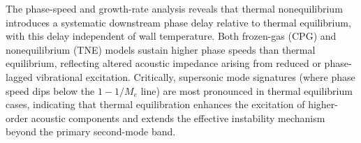 The phase-speed and growth-rate analysis reveals that thermal nonequilibrium introduces a systematic downstream phase delay relative to thermal equilibrium, with this delay independent of wall temperature. Both frozen-gas (\gls{CPG}) and nonequilibrium (\gls{TNE}) models sustain higher phase speeds than thermal equilibrium, reflecting altered acoustic impedance arising from reduced or phase-lagged vibrational excitation. Critically, supersonic mode signatures (where phase speed dips below the $1 - 1/M_e$ line) are most pronounced in thermal equilibrium cases, indicating that thermal equilibration enhances the excitation of higher-order acoustic components and extends the effective instability mechanism beyond the primary second-mode band.


